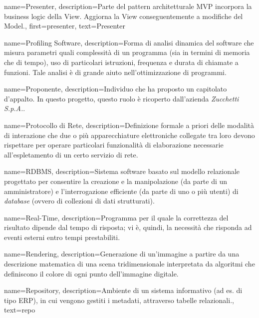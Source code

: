 {
name={Presenter},
description={Parte del pattern architetturale MVP incorpora la business logic della View. Aggiorna la View conseguentemente a modifiche del Model.},
first={presenter},
text={Presenter}
}

{
name={Profiling Software},
description={Forma di analisi dinamica del software che misura parametri quali complessità di un programma (sia in termini di memoria che di tempo), uso di particolari istruzioni, frequenza e durata di chiamate a funzioni. Tale analisi è di grande aiuto nell'ottimizzazione di programmi.}
}

{
name={Proponente},
description={Individuo che ha proposto un capitolato d’appalto. In questo progetto, questo ruolo è ricoperto dall'azienda \textit{Zucchetti S.p.A.}.}
}

{
name={Protocollo di Rete},
description={Definizione formale a priori delle modalità di interazione che due o più apparecchiature elettroniche collegate tra loro devono rispettare per operare particolari funzionalità di elaborazione necessarie all'espletamento di un certo servizio di rete.}
}

{
name={RDBMS},
description={Sistema software basato sul modello relazionale progettato per consentire la creazione e la manipolazione (da parte di un amministratore) e l'interrogazione efficiente (da parte di uno o più utenti) di \textit{database} (ovvero di collezioni di dati strutturati).}
}

{
name={Real-Time},
description={Programma per il quale la correttezza del risultato dipende dal tempo di risposta; vi è, quindi, la necessità che risponda ad eventi esterni entro tempi prestabiliti.}
}

{
name={Rendering},
description={Generazione di un'immagine a partire da una descrizione matematica di una scena tridimensionale interpretata da algoritmi che definiscono il colore di ogni punto dell'immagine digitale.}
}

{
name={Repository},
description={Ambiente di un sistema informativo (ad es. di tipo ERP), in cui vengono gestiti i metadati, attraverso tabelle relazionali.},
text={repo}
}

